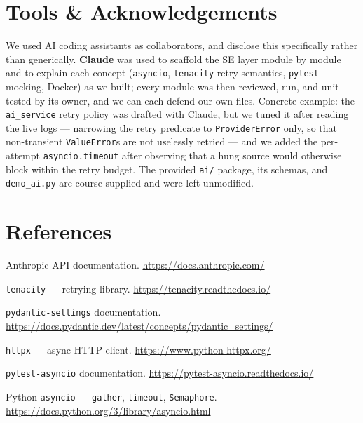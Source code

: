 \documentclass[11pt,a4paper]{article}
\begin{document}
\section{Tools \& Acknowledgements}\label{sec:tools}

We used AI coding assistants as collaborators, and disclose this specifically rather than
generically. \textbf{Claude} was used to scaffold the SE layer module by module and to explain
each concept (\texttt{asyncio}, \texttt{tenacity} retry semantics, \texttt{pytest} mocking,
Docker) as we built; every module was then reviewed, run, and unit-tested by its owner, and we
can each defend our own files. Concrete example: the \texttt{ai\_service} retry policy was
drafted with Claude, but we tuned it after reading the live logs --- narrowing the retry
predicate to \texttt{ProviderError} only, so that non-transient \texttt{ValueError}s are not
uselessly retried --- and we added the per-attempt \texttt{asyncio.timeout} after observing
that a hung source would otherwise block within the retry budget. The provided \texttt{ai/}
package, its schemas, and \texttt{demo\_ai.py} are course-supplied and were left unmodified.

\section*{References}

\begin{enumerate}[label={[\arabic*]},leftmargin=2.4em,itemsep=2pt]
  \item Anthropic API documentation. \url{https://docs.anthropic.com/}
  \item \texttt{tenacity} --- retrying library. \url{https://tenacity.readthedocs.io/}
  \item \texttt{pydantic-settings} documentation. \url{https://docs.pydantic.dev/latest/concepts/pydantic_settings/}
  \item \texttt{httpx} --- async HTTP client. \url{https://www.python-httpx.org/}
  \item \texttt{pytest-asyncio} documentation. \url{https://pytest-asyncio.readthedocs.io/}
  \item Python \texttt{asyncio} --- \texttt{gather}, \texttt{timeout}, \texttt{Semaphore}. \url{https://docs.python.org/3/library/asyncio.html}
\end{enumerate}
\end{document}
